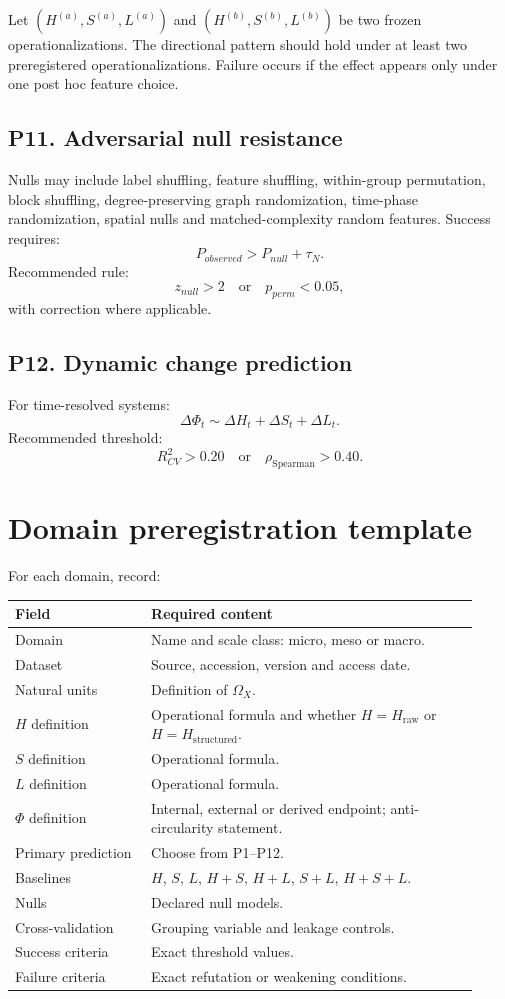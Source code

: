 \documentclass[11pt,a4paper]{article}
\newcommand{\Hraw}{H_{\mathrm{raw}}}
\newcommand{\Hstr}{H_{\mathrm{structured}}}
\begin{document}
Let $(H^{(a)},S^{(a)},L^{(a)})$ and $(H^{(b)},S^{(b)},L^{(b)})$ be two frozen operationalizations.
The directional pattern should hold under at least two preregistered operationalizations.
Failure occurs if the effect appears only under one post hoc feature choice.

\subsection{P11. Adversarial null resistance}

Nulls may include label shuffling, feature shuffling, within-group permutation, block shuffling, degree-preserving graph randomization, time-phase randomization, spatial nulls and matched-complexity random features.
Success requires:
\[
P_{observed}>P_{null}+\tau_N.
\]
Recommended rule:
\[
z_{null}>2
\quad\text{or}\quad
p_{perm}<0.05,
\]
with correction where applicable.

\subsection{P12. Dynamic change prediction}

For time-resolved systems:
\[
\Delta\Phi_t\sim\Delta H_t+\Delta S_t+\Delta L_t.
\]
Recommended threshold:
\[
R^2_{CV}>0.20
\quad\text{or}\quad
\rho_{\mathrm{Spearman}}>0.40.
\]

\section{Domain preregistration template}

For each domain, record:
\begin{longtable}{p{0.27\linewidth}p{0.65\linewidth}}
\toprule
\textbf{Field} & \textbf{Required content}\\
\midrule
Domain & Name and scale class: micro, meso or macro.\\
Dataset & Source, accession, version and access date.\\
Natural units & Definition of $\Omega_X$.\\
$H$ definition & Operational formula and whether $H=\Hraw$ or $H=\Hstr$.\\
$S$ definition & Operational formula.\\
$L$ definition & Operational formula.\\
$\Phi$ definition & Internal, external or derived endpoint; anti-circularity statement.\\
Primary prediction & Choose from P1--P12.\\
Baselines & $H$, $S$, $L$, $H+S$, $H+L$, $S+L$, $H+S+L$.\\
Nulls & Declared null models.\\
Cross-validation & Grouping variable and leakage controls.\\
Success criteria & Exact threshold values.\\
Failure criteria & Exact refutation or weakening conditions.\\
\bottomrule
\end{longtable}
\end{document}
